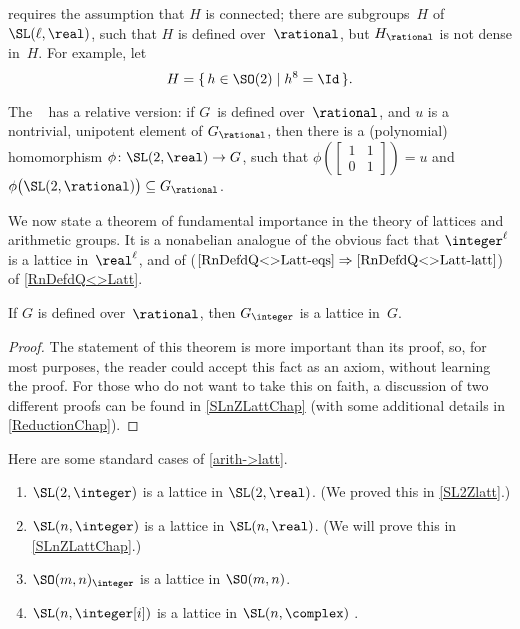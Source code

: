 \begin{warn} \label{HQnotdense}
  requires the assumption
that $H$ is connected; there are subgroups~$H$ of
$\SL(\ell,\real)$, such that $H$ is defined
over~$\rational$, but $H_{\rational}$ is not dense in~$H$.
For example, let 
 $$ H = \{\, h \in \SO(2) \mid h^8 = \Id \,\} .$$
 \end{warn}
 
 \begin{rem} \label{JacobsonMorosovOverF}
The ~
has a relative version: if $G$~is defined over~$\rational$, and $u$ is a nontrivial, unipotent element of $G_\rational$, then there is a (polynomial)
homomorphism $\phi \colon \SL(2,\real) \to G$, such that
 $\phi 
\left( \left[ \begin{smallmatrix}
 1& 1 \\
 0 & 1
 \end{smallmatrix}
 \right] \right)
 = u$
 and
$\phi \bigl( \SL(2,\rational) \bigr) \subseteq G_\rational$.
\end{rem}


We now state a theorem of fundamental importance in the theory of lattices and
arithmetic groups. It is a nonabelian analogue of the obvious fact that $\integer^\ell$ is a lattice in~$\real^\ell$, and of ($\ref{RnDefdQ<>Latt-eqs} \Rightarrow \ref{RnDefdQ<>Latt-latt}$) of \cref{RnDefdQ<>Latt}.

\begin{major} \label{arith->latt}
 If $G$ is defined over~$\rational$, then $G_{\integer}$ is
a lattice in~$G$.
 \end{major}

\begin{proof}
The statement of this theorem is more important than its proof, so, for
most purposes, the reader could accept this fact as an axiom, without 
learning the proof.\label{arith->lattNotPf}
For those who do not want to take this on faith, a discussion of two different proofs 
can be found in \cref{SLnZLattChap} (with some additional details in \cref{ReductionChap}).
\end{proof}


\begin{eg} \label{ArithLattEg}
 Here are some standard cases of
\cref{arith->latt}.%
\noprelistbreak
 \begin{enumerate}
 \item $\SL(2,\integer)$ is a lattice in $\SL(2,\real)$. 
 (We proved this in \cref{SL2Zlatt}.)
 \item \label{ArithLattEg-SLnZ}
$\SL(n,\integer)$ is a lattice in $\SL(n,\real)$.
  (We will prove this in \cref{SLnZLattChap}.) 

 \item $\SO(m,n)_{\integer}$ is a lattice in $\SO(m,n)$.
 \item $\SL(n, \integer[i])$ is a lattice in
$\SL(n,\complex)$ .
 \end{enumerate}
 \end{eg}

